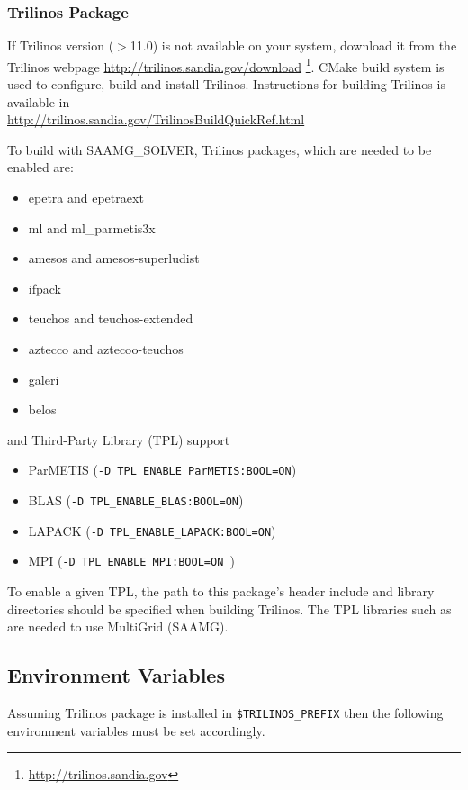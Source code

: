 \subsubsection{Trilinos Package}
If Trilinos version ($>$11.0) is not available on your system, download it from the Trilinos webpage
{\url {http://trilinos.sandia.gov/download}}
\footnote{\url{http://trilinos.sandia.gov}}. CMake build system is used to configure, build and install
Trilinos. Instructions for building Trilinos is available in \\
{\url {http://trilinos.sandia.gov/TrilinosBuildQuickRef.html}}

To build {\opal} with {SAAMG\_SOLVER}, Trilinos packages, which are needed to be enabled are:
\begin{itemize}
  \item epetra and epetraext
  \item ml and ml\_parmetis3x
  \item amesos and amesos-superludist
  \item ifpack
  \item teuchos and teuchos-extended
  \item aztecco and aztecoo-teuchos
  \item galeri
  \item belos
\end{itemize}
and Third-Party Library (TPL) support
 \begin{itemize}
  \item ParMETIS (\texttt{-D TPL\_ENABLE\_ParMETIS:BOOL=ON})
  \item BLAS  (\texttt{-D TPL\_ENABLE\_BLAS:BOOL=ON})
  \item LAPACK (\texttt{-D TPL\_ENABLE\_LAPACK:BOOL=ON})
  \item MPI (\texttt{-D TPL\_ENABLE\_MPI:BOOL=ON })
\end{itemize}
To enable a given TPL,  the path to this package's header include and library directories should be specified
when building Trilinos. The TPL libraries such as  are needed
to use MultiGrid (SAAMG).

\subsection{Environment Variables}
\label{ssec:envvar_MG}

Assuming Trilinos package is installed in \texttt{\$TRILINOS\_PREFIX} then the following environment variables must be set accordingly.

